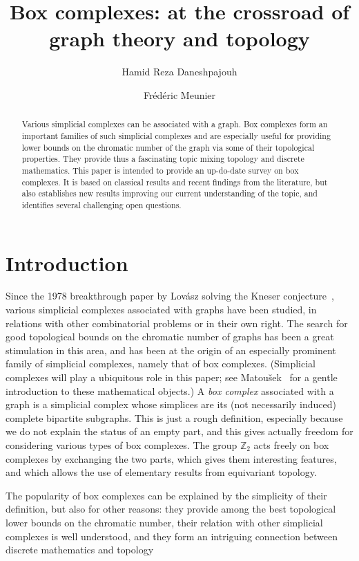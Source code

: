 \documentclass[12pt]{amsart}
\title{Box complexes: at the crossroad of \\ graph theory and topology}
\author{Hamid Reza Daneshpajouh}
\author{Fr\'ed\'eric Meunier}
\theoremstyle{definition}
\def\Z{\mathbb{Z}}
\begin{document}
\begin{abstract}
Various simplicial complexes can be associated with a graph. Box complexes form an important families of such simplicial complexes and are especially useful for providing lower bounds on the chromatic number of the graph via some of their topological properties. They provide thus a fascinating topic mixing topology and discrete mathematics. This paper is intended to provide an up-do-date survey on box complexes. It is based on classical results and recent findings from the literature, but also establishes new results improving our current understanding of the topic, and identifies several challenging open questions.
\end{abstract}


\maketitle

\section{Introduction}

Since the 1978 breakthrough paper by Lov\'asz solving the Kneser conjecture~\cite{lovasz1978kneser}, various simplicial complexes associated with graphs have been studied, in relations with other combinatorial problems or in their own right. The search for good topological bounds on the chromatic number of graphs has been a great stimulation in this area, and has been at the origin of an especially prominent family of simplicial complexes, namely that of box complexes. (Simplicial complexes will play a ubiquitous role in this paper; see Matou{\v{s}}ek~\cite[Chapter 1]{matousek2008using} for a gentle introduction to these mathematical objects.) A {\em box complex} associated with a graph is a simplicial complex whose simplices are its (not necessarily induced) complete bipartite subgraphs. This is just a rough definition, especially because we do not explain the status of an empty part, and this gives actually freedom for considering various types of box complexes. The group $\Z_2$ acts freely on box complexes by exchanging the two parts, which gives them interesting features, and which allows the use of elementary results from equivariant topology.

The popularity of box complexes can be explained by the simplicity of their definition, but also for other reasons: they provide among the best topological lower bounds on the chromatic number, their relation with other simplicial complexes is well understood, and they form an intriguing connection between discrete mathematics and topology
\end{document}
